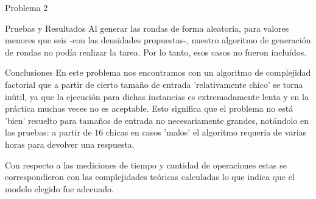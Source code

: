 \begin{section}{Problema 2}
\begin{subsection}{Pruebas y Resultados}
		Al generar las rondas de forma aleatoria, para valores menores que seis -con las densidades propuestas-, nuestro algoritmo de generación de rondas no podía realizar la tarea. Por lo tanto, esos casos no fueron incluídos.
	\end{subsection}
	\begin{subsection}{Conclusiones}
			En este problema nos encontramos con un algoritmo de complejidad factorial que a partir de cierto tamaño de entrada 'relativamente chico' se torna inútil, ya que la ejecución para dichas instancias es extremadamente lenta y en la práctica muchas veces no es aceptable. Esto significa que el problema no está 'bien' resuelto para tamaños de entrada no necesariamente grandes, notándolo en las pruebas: a partir de $16$ chicas en casos 'malos' el algoritmo requeria de varias horas para devolver una respuesta. 

	Con respecto a las mediciones de tiempo y cantidad de operaciones estas se correspondieron con las complejidades teóricas calculadas lo que indica que el modelo elegido fue adecuado.
	\end{subsection}
\end{section}
